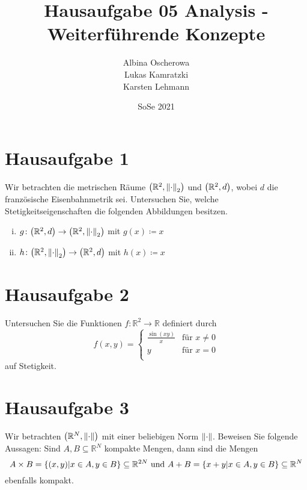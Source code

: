 \documentclass{article}
\author{Albina Oscherowa \\ Lukas Kamratzki \\ Karsten Lehmann}
\date{SoSe 2021}
\title{Hausaufgabe 05 Analysis - Weiterführende Konzepte}
\begin{document}
\section*{Hausaufgabe 1}

Wir betrachten die metrischen Räume $\qty(\mathbb{R}^2, \norm{\cdot}_2)$ und
$\qty(\mathbb{R}^2, d)$, wobei $d$ die französische Eisenbahnmetrik sei.
Untersuchen Sie, welche Stetigkeitseigenschaften die folgenden Abbildungen
besitzen.
\begin{enumerate}[(i)]
\item $g \colon \qty(\mathbb{R}^2, d) \to \qty(\mathbb{R}^2, \norm{\cdot}_2)$
  mit $g(x) \coloneqq x$
\item $h \colon \qty(\mathbb{R}^2, \norm{\cdot}_2) \to \qty(\mathbb{R}^2, d)$
  mit $h(x) \coloneqq x$
\end{enumerate}

\section*{Hausaufgabe 2}

Untersuchen Sie die Funktionen $f \colon \mathbb{R}^2 \to \mathbb{R}$ definiert
durch
\[
  f(x, y) = \begin{cases}
    \frac{\sin(xy)}{x} & \text{für } x \ne 0 \\
    y & \text{für } x = 0 \\
  \end{cases}
\]
auf Stetigkeit.

\section*{Hausaufgabe 3}

Wir betrachten $\qty(\mathbb{R}^N, \norm{\cdot})$ mit einer beliebigen Norm
$\norm{\cdot}$.
Beweisen Sie folgende Aussagen: Sind $A, B \subseteq \mathbb{R}^N$ kompakte
Mengen, dann sind die Mengen
\[
  A \times B = \qty{(x, y) \middle| x \in A, y \in B} \subseteq \mathbb{R}^{2N}
  \text{ und }
  A + B = \qty{x + y \middle| x \in A, y \in B} \subseteq \mathbb{R}^N
\]
ebenfalls kompakt.
\end{document}
